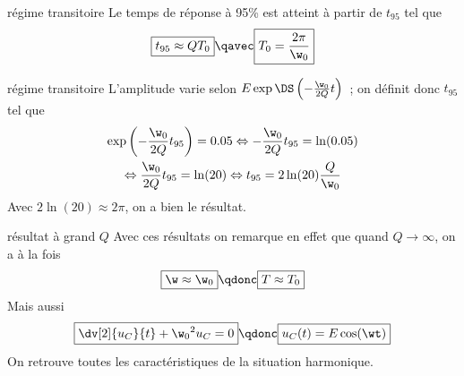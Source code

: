 \documentclass[../main/main.tex]{subfiles}
\begin{document}
\begin{tcbraster}[raster columns=2, raster equal height=rows]
    \begin{prop}[label=prop:transipseudo]{régime transitoire}
        Le temps de réponse à 95\% est atteint à partir de $t_{95}$ tel que
        \begin{equation*}
            \boxed{t_{95} \approx QT_0} \qavec \boxed{T_0 = \frac{2\pi}{\w_0}}
        \end{equation*}
    \end{prop}
    \begin{demo}[label=demo:transipseudo]{régime transitoire}
        L'amplitude varie selon $E\exp \DS \left( -\frac{\w_0}{2Q}t \right)$~; on
        définit donc $t_{95}$ tel que
        \begin{gather*}
            \exp \left(-\frac{\w_0}{2Q}t_{95} \right) = 0.05
            \Leftrightarrow - \frac{\w_0}{2Q}t_{95} = \ln(0.05)\\
            \Leftrightarrow \frac{\w_0}{2Q}t_{95} = \ln(20)
            \Leftrightarrow t_{95} = 2\ln(20) \frac{Q}{\w_0}
        \end{gather*}
        Avec $2\ln(20) \approx 2\pi$, on a bien le résultat.
    \end{demo}
\end{tcbraster}

\begin{impo}[label=impo:pseudograndQ]{résultat à grand $Q$}
    Avec ces résultats on remarque en effet que quand $Q \rightarrow \infty$, on
    a à la fois 
    \begin{equation*}
        \boxed{\w \approx \w_0} \qdonc \boxed{T \approx T_0}
    \end{equation*}
    Mais aussi
    \begin{equation*}
        \boxed{\dv[2]{u_C}{t} + \w_0{}^2u_C = 0} \qdonc \boxed{u_C(t) = E\cos(\wt)}
    \end{equation*}
    On retrouve toutes les caractéristiques de la situation harmonique.
\end{impo}
\end{document}
